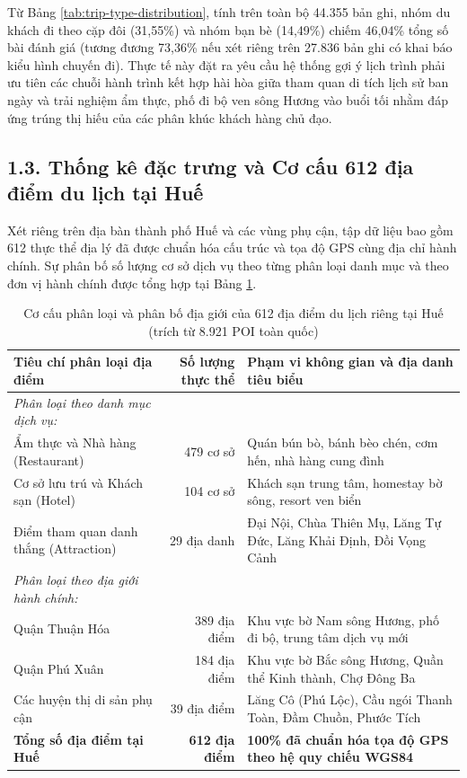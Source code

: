 Từ Bảng \ref{tab:trip-type-distribution}, tính trên toàn bộ 44.355 bản ghi, nhóm du khách đi theo cặp đôi (31,55\%) và nhóm bạn bè (14,49\%) chiếm 46,04\% tổng số bài đánh giá (tương đương 73,36\% nếu xét riêng trên 27.836 bản ghi có khai báo kiểu hình chuyến đi). Thực tế này đặt ra yêu cầu hệ thống gợi ý lịch trình phải ưu tiên các chuỗi hành trình kết hợp hài hòa giữa tham quan di tích lịch sử ban ngày và trải nghiệm ẩm thực, phố đi bộ ven sông Hương vào buổi tối nhằm đáp ứng trúng thị hiếu của các phân khúc khách hàng chủ đạo.

\subsection*{1.3. Thống kê đặc trưng và Cơ cấu 612 địa điểm du lịch tại Huế}
{}

Xét riêng trên địa bàn thành phố Huế và các vùng phụ cận, tập dữ liệu bao gồm 612 thực thể địa lý đã được chuẩn hóa cấu trúc và tọa độ GPS cùng địa chỉ hành chính. Sự phân bố số lượng cơ sở dịch vụ theo từng phân loại danh mục và theo đơn vị hành chính được tổng hợp tại Bảng \ref{tab:hue-places-distribution}.

\begin{table}[htbp]
\centering
\caption{Cơ cấu phân loại và phân bố địa giới của 612 địa điểm du lịch riêng tại Huế (trích từ 8.921 POI toàn quốc)}
\label{tab:hue-places-distribution}
\small
\begin{tabularx}{\textwidth}{l r X}
\hline
\textbf{Tiêu chí phân loại địa điểm} & \textbf{Số lượng thực thể} & \textbf{Phạm vi không gian và địa danh tiêu biểu} \\
\hline
\textit{Phân loại theo danh mục dịch vụ:} & & \\
Ẩm thực và Nhà hàng (Restaurant) & 479 cơ sở & Quán bún bò, bánh bèo chén, cơm hến, nhà hàng cung đình \\
Cơ sở lưu trú và Khách sạn (Hotel) & 104 cơ sở & Khách sạn trung tâm, homestay bờ sông, resort ven biển \\
Điểm tham quan danh thắng (Attraction) & 29 địa danh & Đại Nội, Chùa Thiên Mụ, Lăng Tự Đức, Lăng Khải Định, Đồi Vọng Cảnh \\
\hline
\textit{Phân loại theo địa giới hành chính:} & & \\
Quận Thuận Hóa & 389 địa điểm & Khu vực bờ Nam sông Hương, phố đi bộ, trung tâm dịch vụ mới \\
Quận Phú Xuân & 184 địa điểm & Khu vực bờ Bắc sông Hương, Quần thể Kinh thành, Chợ Đông Ba \\
Các huyện thị di sản phụ cận & 39 địa điểm & Lăng Cô (Phú Lộc), Cầu ngói Thanh Toàn, Đầm Chuồn, Phước Tích \\
\hline
\textbf{Tổng số địa điểm tại Huế} & \textbf{612 địa điểm} & \textbf{100\% đã chuẩn hóa tọa độ GPS theo hệ quy chiếu WGS84} \\
\hline
\end{tabularx}
\end{table}

